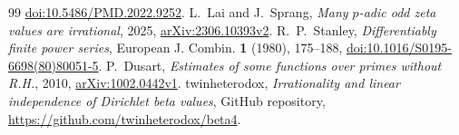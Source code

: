 \documentclass[11pt]{article}
\numberwithin{equation}{section}
\begin{document}
\begin{thebibliography}{99}
\href{https://doi.org/10.5486/PMD.2022.9252}{doi:10.5486/PMD.2022.9252}.
L.~Lai and J.~Sprang, \emph{Many \(p\)-adic odd zeta values are irrational},
2025, \href{https://arxiv.org/abs/2306.10393v2}{arXiv:2306.10393v2}.
R.~P.~Stanley, \emph{Differentiably finite power series}, European J. Combin.
\textbf{1} (1980), 175--188,
\href{https://doi.org/10.1016/S0195-6698(80)80051-5}{doi:10.1016/S0195-6698(80)80051-5}.
P.~Dusart, \emph{Estimates of some functions over primes without R.H.},
2010, \href{https://arxiv.org/abs/1002.0442v1}{arXiv:1002.0442v1}.
twinheterodox, \emph{Irrationality and linear independence of Dirichlet beta
values}, GitHub repository, \url{https://github.com/twinheterodox/beta4}.
\end{thebibliography}
\end{document}
